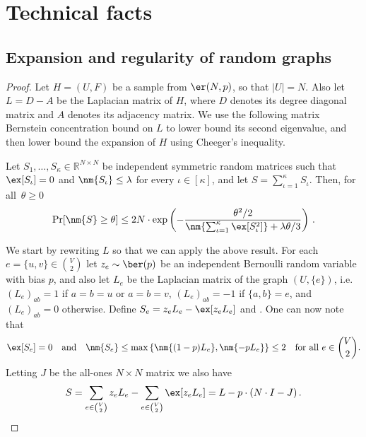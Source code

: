 \section{Technical facts}


\subsection{Expansion and regularity of random graphs}
\label{apndx:randomgraphs}
\erdos*
\begin{proof}
	Let $H=(U,F)$ be a sample from $\er(N,p)$, so that $|U|= N$. Also let $L=D-A$ be the Laplacian matrix of $H$, where $D$ denotes its degree diagonal matrix and $A$ denotes its adjacency matrix. We use the following matrix Bernstein concentration bound on $L$ to lower bound its second eigenvalue, and then lower bound the expansion of $H$ using Cheeger's inequality.
	\begin{theorem}
		\label{th:bern} Let $S_1,\dots, S_\kappa \in \mathbb{R}^{N \times N}$ be independent symmetric random matrices such that $\ex[S_\iota]=0$ and $\nm{S_\iota} \le \lambda$ for every $\iota \in [\kappa]$, and let $S = \sum_{\iota=1}^{\kappa} S_\iota$. Then, for all~$\theta \ge 0$
		\begin{equation*}
			\Pr[\nm{S} \ge \theta] \le 2N \cdot \exp\left(-\frac{\theta^2/2}{\nm{ \sum_{\iota=1}^{\kappa} \ex[S_\iota^2]}+\lambda\theta/3}\right) \, .
		\end{equation*}
	\end{theorem}
	\noindent
	We start by rewriting $L$ so that we can apply the above result. For each $e=\{u,v\} \in \binom{V}{2}$ let $z_e \sim \ber(p)$ be an independent Bernoulli random variable with bias $p$, and also let $L_e $ be the Laplacian matrix of the graph $(U,\{e\})$, i.e. $(L_e)_{ab} = 1$ if $a=b=u$ or $a=b=v$, $(L_e)_{ab} = -1$ if $\{a,b\}=e$, and $(L_e)_{ab}=0$ otherwise. Define $S_e = z_e L_e - \ex[z_eL_e]$ and . One can now note that
	\begin{equation*}
		\ex[S_e]=0 \quad \text{and} \quad \nm{S_e} \le \max\left\{\nm{(1-p)L_e},\nm{-pL_e}\right\} \le 2\quad \text{for all $e\in \binom{V}{2}$.}
	\end{equation*}
	Letting $J$ be the all-ones $N \times N$ matrix we  also have
	\begin{equation*}
		S = \sum_{e \in \binom{V}{2}} z_e L_e - \sum_{e \in \binom{V}{2}} \ex[z_eL_e] = L- p \cdot (N \cdot I-J)\, .
	\end{equation*}

\end{proof}

